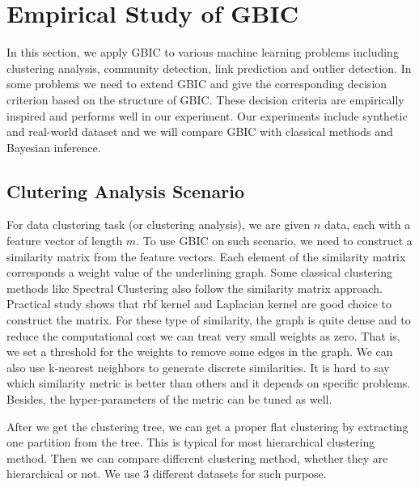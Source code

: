 \section{Empirical Study of GBIC}\label{sec:es}
In this section, we apply GBIC to various machine learning problems including clustering analysis, community detection, link prediction and outlier detection.
In some problems we need to extend GBIC and give the corresponding decision criterion based on the structure of GBIC.
These decision criteria are empirically inspired and performs well in our experiment. Our experiments
include synthetic and real-world dataset and we will compare GBIC with classical methods and Bayesian inference.

\subsection{Clutering Analysis Scenario}\label{subsec:dc}
For data clustering task (or clustering analysis), we are given $n$ data, each with a feature vector of length $m$.
To use GBIC on such scenario, we need to construct a similarity matrix from the feature vectors. Each element of the similarity matrix corresponds a weight value of the underlining graph. Some classical clustering methods like Spectral Clustering also follow the similarity matrix approach. Practical study shows that rbf kernel and Laplacian kernel are good choice to construct the matrix.
For these type of similarity, the graph is quite dense and to reduce the computational cost we can treat very small weights as zero. That is, we set a threshold for the weights to remove some edges in the graph. We can also use k-nearest neighbors to generate discrete similarities. It is hard to say which similarity metric is better than others and it depends on specific problems. Besides, the hyper-parameters of the metric can be tuned as well.

After we get the clustering tree, we can get a proper flat clustering by extracting one partition from the tree. This is typical for most hierarchical clustering method. Then we can compare different clustering method, whether they are hierarchical or not. We use 3 different datasets for such purpose.

